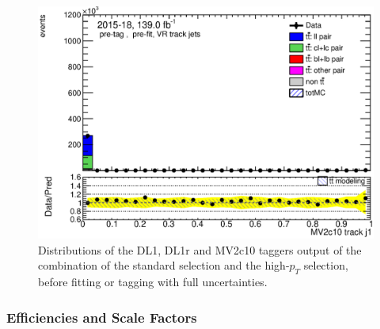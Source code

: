 \documentclass[letterpaper,12pt]{article}
\begin{document}
\begin{figure}[H]
\begin{minipage}[b]{.45\textwidth}
	\includegraphics[width=1\textwidth]{Oct_distributions/pretagNoRwDL1rwithhighpTVRJets_scaledall/DataMC_J1_MV2c10.eps}
	\end{minipage}
	\caption{Distributions of the DL1, DL1r and MV2c10 taggers output of 
	the combination of the standard selection and the high-$p_T$ selection, 
	before fitting or tagging with full uncertainties.} \label{fig:taggers_VRJets}
	\end{figure}	

\subsubsection{Efficiencies and Scale Factors}
\end{document}

